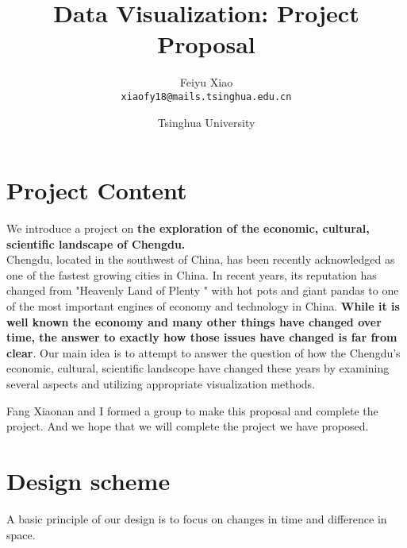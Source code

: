 \documentclass{article}
\title{Data Visualization: Project Proposal} %
\author{Feiyu Xiao \quad 2018210441\\ \texttt{xiaofy18@mails.tsinghua.edu.cn}} %
\date{Tsinghua University} %
\begin{document}
\maketitle %


\section{Project Content} %
We introduce a project on \textbf{the exploration of the economic, cultural, scientific landscape of Chengdu.}\\
Chengdu, located in the southwest of China, has been recently acknowledged as one of the fastest growing cities in China. In recent years, its reputation has changed from "Heavenly Land of Plenty " with hot pots and giant pandas to one of the most important engines of economy and technology in China. \textbf{While it is well known the economy and many other things have changed over time, the answer to exactly how those issues have changed is far from clear}. Our main idea is to attempt to answer the question of how the Chengdu's economic, cultural, scientific landscope have changed these years by examining several aspects and utilizing appropriate visualization methods.

\begin{info} %
	Fang Xiaonan and I formed a group to make this proposal and complete the project. And we hope that we will complete the project we have proposed.
\end{info}


\section{Design scheme} %
A basic principle of our design is to focus on changes in time and difference in space.
\end{document}
